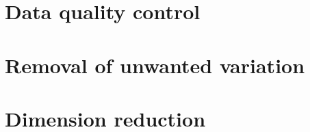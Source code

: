 \section{Data quality control}


\clearpage

\section{Removal of unwanted variation}



\clearpage

\section{Dimension reduction}



\clearpage